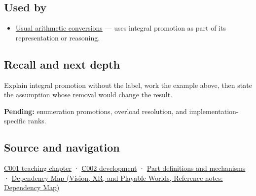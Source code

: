 \subsection{Used by}\label{appendix-45303d03796a-used-by}

\hypertarget{appendix-45303d03796a-used-by}{}

\begin{itemize}
\tightlist
\item
  \hyperref[appendix-5e2d663adf7f]{Usual arithmetic conversions} --- uses integral promotion as part of its representation or reasoning.
\end{itemize}

\subsection{Recall and next depth}\label{appendix-45303d03796a-recall-and-next-depth}

\hypertarget{appendix-45303d03796a-recall-and-next-depth}{}

Explain integral promotion without the label, work the example above, then state the assumption whose removal would change the result.

\textbf{Pending:} enumeration promotions, overload resolution, and implementation-specific ranks.

\subsection{Source and navigation}\label{appendix-45303d03796a-source-and-navigation}

\hypertarget{appendix-45303d03796a-source-and-navigation}{}

\hyperref[01-foundations-i-ch001-from-a-signal-to-an-interpretation]{C001 teaching chapter} · \hyperref[01-foundations-i-ch001-arithmetic-becomes-a-policy]{C002 development} · \hyperref[appendix-fd090d982a15]{Part definitions and mechanisms} · \href{../07-Vision-XR-and-Playable-Worlds/main.pdf\#nameddest=appendix-4ad47bdd269a}{Dependency Map (Vision, XR, and Playable Worlds, Reference notes: Dependency Map)}
